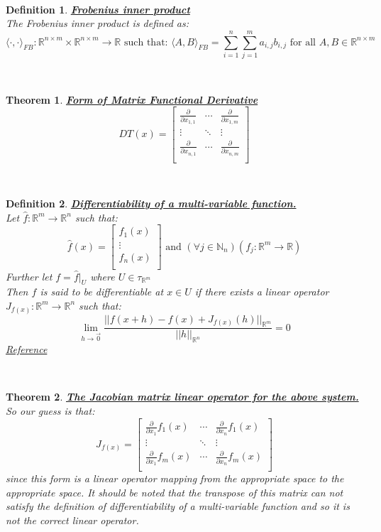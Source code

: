 \documentclass[12pt]{extarticle}
\theoremstyle{plain}
\newtheorem{thm}{Theorem}[section]
\theoremstyle{plain}
\theoremstyle{plain}
\theoremstyle{Definition}
\newtheorem{def.}{Definition}[section]
\theoremstyle{Definition}
\theoremstyle{plain}
\theoremstyle{plain}
\newcommand{\cut}[0]{\noindent\framebox[\linewidth]{\rule{\linewidth}{2pt}}\\}
\begin{document}
\cut
\begin{def.} \underline{\textbf{Frobenius inner product}} \\
	The Frobenius inner product is defined as: \\ 
	$$\langle \cdot , \cdot \rangle_{FB} : \mathbb{R}^{n \times m} \times \mathbb{R}^{n \times m} \to \mathbb{R} \text{ such that: } \langle A,B \rangle_{FB} = \sum_{i=1}^n \sum_{j=1}^m a_{i,j}b_{i,j} \text{ for all } A,B \in \mathbb{R}^{n \times m}$$
\end{def.}
\cut
\begin{thm} \underline{\textbf{Form of Matrix Functional Derivative}} \\
	\[
	DT(x) = 
	\begin{bmatrix}
	\frac{\partial}{\partial x_{1,1}} & \cdots & \frac{\partial}{\partial x_{1,m}} \\ 
	\vdots & \ddots & \vdots \\
	\frac{\partial}{\partial x_{n,1}} & \cdots & \frac{\partial}{\partial x_{n,m}} \\ 
	\end{bmatrix}	
	\]
\end{thm}
\cut
\begin{def.} \underline{\textbf{Differentiability of a multi-variable function.}} \\
	Let $\hat{f} : \mathbb{R}^m \to \mathbb{R}^n$ such that: \\ 
	\[
	\hat{f}(x) = 
	\begin{bmatrix}
	f_1(x) \\ 
	\vdots \\
	f_n(x) \\
	\end{bmatrix}
	\text{ and } 
	(\forall j \in \mathbb{N}_n)(f_j : \mathbb{R}^m \to \mathbb{R})
	\]
	Further let $f = \hat{f}|_U$ where $U \in \tau_{\mathbb{R}^m}$ \\ 
	Then $f$ is said to be differentiable at $x \in U$ if there exists a linear operator $J_{f(x)}: \mathbb{R}^m \to \mathbb{R}^n$ such that: \\ 
	$$\lim_{h \to \vec{0}} \frac{||f(x + h) - f(x) + J_{f(x)}(h)||_{\mathbb{R}^m}}{||h||_{\mathbb{R}^n}} = 0$$
	\href{https://en.wikipedia.org/wiki/Differentiable_function}{Reference}
\end{def.}
\cut
\begin{thm} \underline{\textbf{The Jacobian matrix linear operator for the above system.}} \\ 
	So our guess is that: \\ 
	\[
	J_{f(x)} = 
	\begin{bmatrix}
	\frac{\partial}{\partial x_1} f_1(x) & \cdots & \frac{\partial}{\partial x_n} f_1(x) \\ 
	\vdots & \ddots & \vdots \\ 
	\frac{\partial}{\partial x_1} f_m(x) & \cdots & \frac{\partial}{\partial x_n} f_m(x) \\ 
	\end{bmatrix}
	\]
	since this form is a linear operator mapping from the appropriate space to the appropriate space. It should be noted that the transpose of this matrix can not satisfy the definition of differentiability of a multi-variable function and so it is not the correct linear operator. 
\end{thm}
\end{document}
